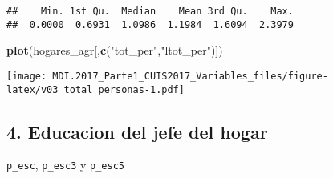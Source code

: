 \documentclass[11pt,]{article}
\newenvironment{Shaded}{\begin{snugshade}}{\end{snugshade}}
\newcommand{\KeywordTok}[1]{\textcolor[rgb]{0.13,0.29,0.53}{\textbf{#1}}}
\newcommand{\StringTok}[1]{\textcolor[rgb]{0.31,0.60,0.02}{#1}}
\newcommand{\OperatorTok}[1]{\textcolor[rgb]{0.81,0.36,0.00}{\textbf{#1}}}
\newcommand{\NormalTok}[1]{#1}
\begin{document}
\begin{Shaded}
\end{Shaded}

\begin{verbatim}
##    Min. 1st Qu.  Median    Mean 3rd Qu.    Max. 
##  0.0000  0.6931  1.0986  1.1984  1.6094  2.3979
\end{verbatim}

\begin{Shaded}
\begin{Highlighting}[]
\KeywordTok{plot}\NormalTok{(hogares_agr[,}\KeywordTok{c}\NormalTok{(}\StringTok{"tot_per"}\NormalTok{,}\StringTok{"ltot_per"}\NormalTok{)])}
\end{Highlighting}
\end{Shaded}

\texttt{[image: MDI.2017\_Parte1\_CUIS2017\_Variables\_files/figure-latex/v03\_total\_personas-1.pdf]}

\subsection{4. Educacion del jefe del
hogar}\label{educacion-del-jefe-del-hogar}

\texttt{p\_esc}, \texttt{p\_esc3} y \texttt{p\_esc5}
\end{document}
